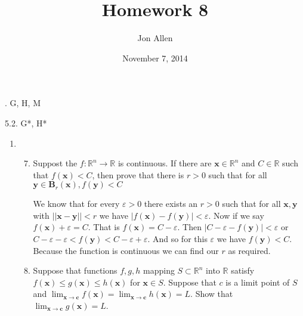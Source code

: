 \documentclass[letterpaper]{article}
\begin{document}
\title{Homework 8}
\date{November 7, 2014}
\author{Jon Allen}
. G, H, M

5.2. G*, H*

\renewcommand{\labelenumi}{5.\arabic{enumi}}
\renewcommand{\labelenumii}{\Alph{enumii}.}
\renewcommand{\labelenumiii}{(\alph{enumiii})}
\begin{enumerate}
\item
  \begin{enumerate}
  \setcounter{enumii}{6}
  \item
    Suppost the $f:\mathbb{R}^n\to\mathbb{R}$ is continuous. If there are $\boldsymbol{x}\in \mathbb{R}^n$ and $C\in \mathbb{R}$ such that $f(\boldsymbol{x})<C$, then prove that there is $r>0$ such that for all $\boldsymbol{y}\in \boldsymbol{B}_r(\boldsymbol{x}),f(\boldsymbol{y})<C$

    We know that for every $\varepsilon>0$ there exists an $r>0$ such that for all $\boldsymbol{x},\boldsymbol{y}$ with $||\boldsymbol{x}-\boldsymbol{y}||<r$ we have $|f(\boldsymbol{x})-f(\boldsymbol{y})|<\varepsilon$. Now if we say $f(\boldsymbol{x})+\varepsilon=C$. That is $f\left(\boldsymbol{x}\right)=C-\varepsilon$. Then $|C-\varepsilon-f\left(\boldsymbol{y}\right)|<\varepsilon$ or $C-\varepsilon-\varepsilon<f(\boldsymbol{y})<C-\varepsilon+\varepsilon$. And so for this $\varepsilon$ we have $f(\boldsymbol{y})<C$. Because the function is continuous we can find our $r$ as required.
  \item
    Suppose that functions $f,g,h$ mapping $S\subset \mathbb{R}^n$ into $\mathbb{R}$ satisfy $f(\boldsymbol{x})\le g(\boldsymbol{x})\le h(\boldsymbol{x})$ for $\boldsymbol{x}\in S$. Suppose that $c$ is a limit point of $S$ and $\lim_{\boldsymbol{x}\to\boldsymbol{c}}f(\boldsymbol{x})=\lim_{\boldsymbol{x}\to\boldsymbol{c}}h(\boldsymbol{x})=L$. Show that $\lim_{\boldsymbol{x}\to\boldsymbol{c}}g(\boldsymbol{x})=L$.


\end{enumerate}
\end{enumerate}
\end{document}
